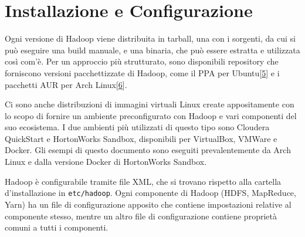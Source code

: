 \documentclass[italian,a4paper, twoside, 12pt]{report}
\begin{document}
\hypertarget{installazione-e-configurazione}{\section{Installazione e
Configurazione}\label{installazione-e-configurazione}}

Ogni versione di Hadoop viene distribuita in tarball, una con i
sorgenti, da cui si può eseguire una build manuale, e una binaria, che
può essere estratta e utilizzata così com'è. Per un approccio più
strutturato, sono disponibili repository che forniscono versioni
pacchettizzate di Hadoop, come il PPA per
Ubuntu{[}\protect\hyperlink{ref-hadoop-ppa}{5}{]} e i pacchetti AUR per
Arch Linux{[}\protect\hyperlink{ref-hadoop-aur}{6}{]}.

Ci sono anche distribuzioni di immagini virtuali Linux create
appositamente con lo scopo di fornire un ambiente preconfigurato con
Hadoop e vari componenti del suo ecosistema. I due ambienti più
utilizzati di questo tipo sono Cloudera QuickStart e HortonWorks
Sandbox, disponibili per VirtualBox, VMWare e Docker. Gli esempi di
questo documento sono eseguiti prevalentemente da Arch Linux e dalla
versione Docker di HortonWorks Sandbox.

Hadoop è configurabile tramite file XML, che si trovano rispetto alla
cartella d'installazione in \texttt{etc/hadoop}. Ogni componente di
Hadoop (HDFS, MapReduce, Yarn) ha un file di configurazione apposito che
contiene impostazioni relative al componente stesso, mentre un altro
file di configurazione contiene proprietà comuni a tutti i componenti.
\end{document}

